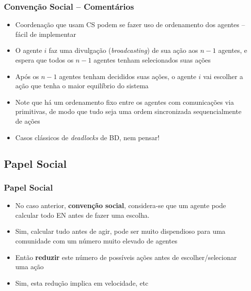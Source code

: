 \begin{frame}[allowframebreaks=0.9]
\frametitle{Convenção Social -- Comentários}

\begin{itemize}
  \item Coordenação que usam CS podem se fazer uso de ordenamento dos agentes -- fácil de implementar
  
  \item O agente $i$ faz uma divulgação (\textit{broadcasting}) de sua ação aos $n-1$ agentes, e espera   que todos os  $n-1$ agentes tenham selecionados suas ações
  
  \item Após os $n-1$ agentes tenham decididos suas ações, o agente $i$
  vai escolher a ação que tenha o maior equilíbrio do sistema
  
  \item Note que há um ordenamento fixo entre os agentes com comunicações via  primitivas, de modo que tudo seja uma ordem sincronizada sequencialmente de ações
  
  \item Casos clássicos de \textit{deadlocks} de BD, nem pensar!
  
\end{itemize}

\end{frame}




\subsection{Papel Social}

\begin{frame}[allowframebreaks=0.9]
\frametitle{Papel Social}

\begin{itemize}
  \item No caso anterior, \textbf{convenção social}, considera-se que um agente pode calcular 
  todo EN antes de fazer uma escolha.
  \item Sim, calcular tudo antes de agir, pode ser muito dispendioso para uma comunidade
com um número  muito elevado de agentes
   \item Então \textbf{reduzir} este número de possíveis ações antes de escolher/selecionar uma ação 
   \item Sim, esta redução implica em velocidade, etc



\end{itemize}

\end{frame}


